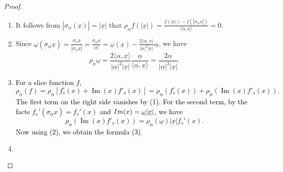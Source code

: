 \documentclass{amsart}
\theoremstyle{definition}
\theoremstyle{remark}
\numberwithin{equation}{section}
\begin{document}
\begin{proof}
    \begin{enumerate}
       \item It follows from $|\sigma_{\underline{\alpha}}(\underline x)|=|\underline x|$ that $\displaystyle \rho_{\underline\alpha} f(|\underline x|)=\frac{f(|\underline{x}|)-f(|\sigma_{\underline{\alpha}}\underline x|)}{\langle{\underline{\alpha}},\underline x\rangle}=0$.
        \item Since $\displaystyle \underline\omega(\sigma_{\underline{\alpha}}\underline x)=\frac{\sigma_{\underline{\alpha}}\underline x}{|\sigma_{\underline{\alpha}}\underline x|}=\frac{\sigma_{\underline{\alpha}}\underline x}{|\underline x|}=\underline\omega(\underline x)-\frac{2\langle{\underline{\alpha}},\underline{x}\rangle}{|\underline\alpha|^2|\underline x|}\underline{\alpha}$, we have
        \begin{equation*}
            \rho_{\underline\alpha}\underline\omega=\frac{2\langle {\underline{\alpha}}, \underline{x}\rangle}{|{\underline{\alpha}}|^2|\underline x|}\frac{{\underline{\alpha}}}{\langle {\underline{\alpha}}, \underline{x}\rangle }=\frac{2\underline{\alpha}}{|\underline{\alpha}|^2|\underline x|}.
        \end{equation*}
        \item \textcolor{black}{ For a slice function $f$,
        \begin{equation*}
            \rho_{\underline{\alpha}}(f)=\rho_{\underline{\alpha}}[f^\circ_s(x)+\operatorname{Im}(x)f'_s(x)]=\rho_{\underline{\alpha}}(f^\circ_s(x))+\rho_{\underline{\alpha}}(\operatorname{Im}(x)f'_s(x)).
        \end{equation*}
        The first term on the right side vanishes by (1). For the second term, by the facts $f_{s}'(\sigma_{\underline{\alpha}}x)=f_{s}'(x)$ and ${\rm Im}(x)=\underline{\omega}|\underline{x}|$, we have
        \begin{equation*}
            \rho_{\underline{\alpha}}(\operatorname{Im}(x)f'_s(x))=\rho_{\underline{\alpha}}(\underline{\omega})|\underline{x}|f_{s}'(x).
        \end{equation*}
        Now using (2), we obtain the formula (3).
        }
       \item %

\end{enumerate}
\end{proof}
\end{document}
